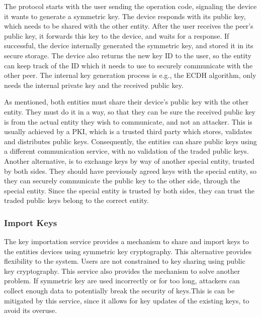 The protocol starts with the user sending the operation code, signaling the device it wants to generate a symmetric key. The device responds with its public key, which needs to be shared with the other entity. After the user receives the peer's public key, it forwards this key to the device, and waits for a response. If successful, the device internally generated the symmetric key, and stored it in its secure storage. The device also returns the new key ID to the user, so the entity can keep track of the ID which it needs to use to securely communicate with the other peer.
The internal key generation process is e.g., the ECDH algorithm, only needs the internal private key and the received public key.

As mentioned, both entities must share their device's public key with the other entity. They must do it in a way, so that they can be sure the received public key is from the actual entity they wish to communicate, and not an attacker. This is usually achieved by a PKI, which is a trusted third party which stores, validates and distributes public keys. 
Consequently, the entities can share public keys using a different communication service, with no validation of the traded public keys. Another alternative, is to exchange keys by way of another special entity, trusted by both sides. They should have previously agreed keys with the special entity, so they can securely communicate the public key to the other side, through the special entity. Since the special entity is trusted by both sides, they can trust the traded public keys belong to the correct entity.

\subsubsection{Import Keys}\label{chap:arch:services:new-comms:import}

The key importation service provides a mechanism to share and import keys to the entities devices using symmetric key cryptography. This alternative provides flexibility to the system.
Users are not constrained to key sharing using public key cryptography. This service also provides the mechanism to solve another problem. If symmetric key are used incorrectly or for too long, attackers can collect enough data to potentially break the security of keys.This is can be mitigated by this service, since it allows for key updates of the existing keys, to avoid its overuse.

